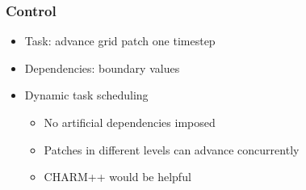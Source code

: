 \begin{frame}[fragile] \frametitle{Control}
      \begin{itemize}
        \item Task: advance grid patch one timestep
        \item Dependencies: boundary values
        \item Dynamic task scheduling
        \begin{itemize}
          \item No artificial dependencies imposed
          \item Patches in different levels can advance concurrently
          \item CHARM++ would be helpful
        \end{itemize}
      \end{itemize}
\end{frame}
